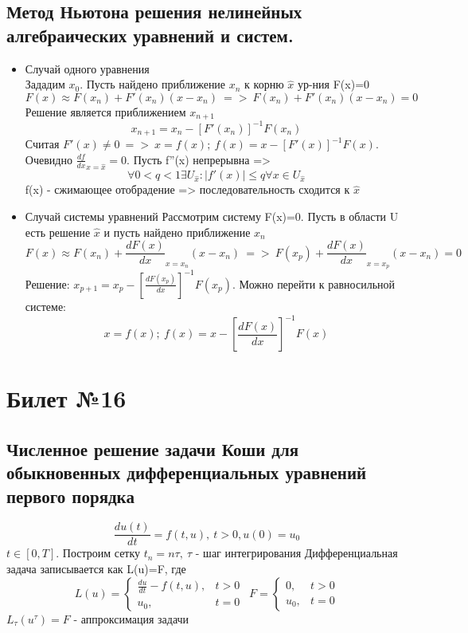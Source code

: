 \documentclass[a4paper]{article}
\begin{document}
\subsection{Метод Ньютона решения нелинейных алгебраических уравнений и систем.}
\begin{itemize}
	\item Случай одного уравнения\\
	Зададим $x_0$. Пусть найдено приближение $x_n$ к корню $\hat{x}$ ур-ния F(x)=0
	$$ F(x) \approx F(x_n) + F'(x_n)(x-x_n) \ => \ F(x_n)+F'(x_n)(x-x_n)=0 $$
	Решение является приближением $x_{n+1}$
	$$ x_{n+1} = x_n - [F'(x_n)]^{-1}F(x_n) $$
	Считая $F'(x) \neq 0 \ => \ x=f(x); \ f(x)=x-[F'(x)]^{-1}F(x)$. Очевидно $\frac{df}{dx}_{x=\hat{x}} = 0$. 
	Пусть f''(x) непрерывна => $$\forall 0<q<1 \exists U_{\hat{x}}: |f'(x)| \leq q \forall x \in U_{\hat{x}}$$
	f(x) - сжимающее отобрадение => последовательность сходится к $\hat{x}$
	\item Случай системы уравнений
	Рассмотрим систему F(x)=0. Пусть в области U есть решение $\hat{x}$ и пусть найдено приближение $x_n$
	$$ F(x) \approx F(x_n) + \frac{dF(x)}{dx}_{x=x_n}(x-x_n) \ => \ F(x_p) + \frac{dF(x)}{dx}_{x=x_p}(x-x_n) = 0 $$
	Решение: $x_{p+1} = x_p - [\frac{dF(x_p)}{dx}]^{-1}F(x_p)$. Можно перейти к равносильной системе:
	$$ x=f(x); \ f(x)=x-[\frac{dF(x)}{dx}]^{-1}F(x) $$
\end{itemize}

\section{Билет №16}
\subsection{Численное решение задачи Коши для обыкновенных дифференциальных уравнений первого порядка}

$$ \frac{du(t)}{dt}=f(t,u), \ t>0, u(0)=u_0 $$
$t \in [0,T]$. Построим сетку ${t_n=n\tau}, \ \tau$ - шаг интегрирования
Дифференциальная задача записывается как L(u)=F, где
$$ L(u) = \begin{cases}
	\frac{du}{dt} - f(t,u), & t>0\\
	u_0, &  t=0 \end{cases} \ \

	F= \begin{cases}
	0, & t>0\\
	u_0, & t=0\end{cases}$$
$L_\tau(u^\tau)=F$ - аппроксимация задачи
\end{document}
